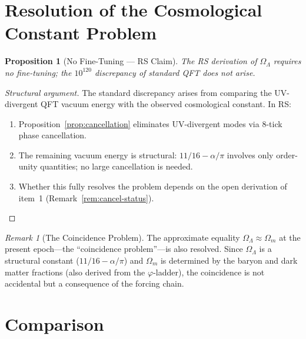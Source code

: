 \documentclass[12pt,a4paper]{article}
\newtheorem{proposition}[theorem]{Proposition}
\theoremstyle{definition}
\theoremstyle{remark}
\newtheorem{remark}[theorem]{Remark}
\begin{document}
\section{Resolution of the Cosmological Constant Problem}
\label{sec:resolution}

\begin{proposition}[No Fine-Tuning --- RS Claim]
\label{prop:no-tuning}
The RS derivation of $\Omega_\Lambda$ requires no fine-tuning;
the $10^{120}$ discrepancy of standard QFT does not arise.
\end{proposition}

\begin{proof}[Structural argument]
The standard discrepancy arises from comparing the UV-divergent QFT
vacuum energy with the observed cosmological constant.  In RS:
\begin{enumerate}[nosep]
  \item Proposition~\ref{prop:cancellation} eliminates UV-divergent
  modes via 8-tick phase cancellation.
  \item The remaining vacuum energy is structural: $11/16 - \alpha/\pi$
  involves only order-unity quantities; no large cancellation is needed.
  \item Whether this fully resolves the problem depends on the
  open derivation of item~1 (Remark~\ref{rem:cancel-status}).
\end{enumerate}
\end{proof}

\begin{remark}[The Coincidence Problem]
The approximate equality $\Omega_\Lambda \approx \Omega_m$ at the
present epoch---the ``coincidence problem''---is also resolved.
Since $\Omega_\Lambda$ is a structural constant ($11/16 - \alpha/\pi$)
and $\Omega_m$ is determined by the baryon and dark matter fractions
(also derived from the $\varphi$-ladder), the coincidence is not
accidental but a consequence of the forcing chain.
\end{remark}

\section{Comparison}
\label{sec:comparison}
\end{document}
